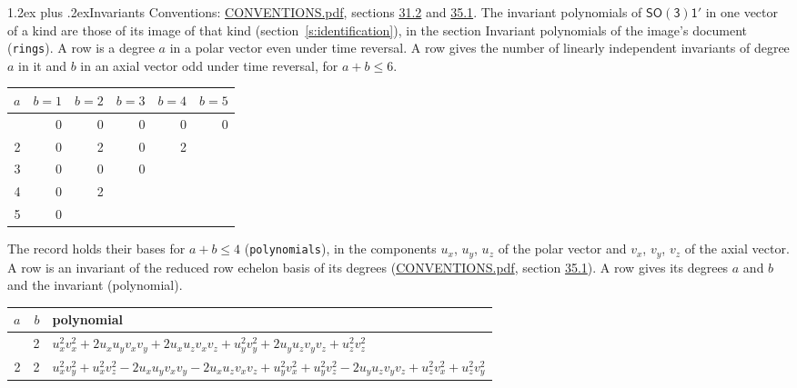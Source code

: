 \documentclass[10pt,a4paper]{article}
\makeatletter
\renewcommand\section{\@startsection{section}{1}{\z@}{-3ex plus -1ex minus -.2ex}%
  {1.2ex plus .2ex}{\normalfont\large\sffamily\bfseries\color{parttitle}}}
\numberwithin{equation}{section}
\newcommand{\grp}[1]{\mathsf{#1}}
\makeatother
\begin{document}
\section{Invariants}\label{s:invariants}
Conventions: \href{../../CONVENTIONS.pdf}{CONVENTIONS.pdf}, sections \href{../../CONVENTIONS.pdf\#conv.31.2}{31.2} and \href{../../CONVENTIONS.pdf\#conv.35.1}{35.1}.
The invariant polynomials of $\grp{SO(3)1'}$ in one vector of a kind are those of its image of that kind (section~\ref{s:identification}), in the section Invariant polynomials of the image's document (\texttt{rings}).
\leavevmode\label{n:index.degree.polar}\label{n:index.degree.axial}A row is a degree $a$ in a polar vector even under time reversal. A row gives the number of linearly independent invariants of degree $a$ in it and $b$ in an axial vector odd under time reversal, for $a + b \le 6$.
{\small\begin{longtable}{@{}rrrrrr@{}}\toprule
$a$ & $b = 1$ & $b = 2$ & $b = 3$ & $b = 4$ & $b = 5$\\\midrule\endhead
\bottomrule\endfoot\endlastfoot
1 & 0 & 0 & 0 & 0 & 0\\*
2 & 0 & 2 & 0 & 2 & \\*
3 & 0 & 0 & 0 &  & \\*
4 & 0 & 2 &  &  & \\*
5 & 0 &  &  &  & \\
\bottomrule\end{longtable}}
\leavevmode\label{n:local.component.polar}\label{n:local.component.axial}The record holds their bases for $a + b \le 4$ (\texttt{polynomials}), in the components $u_{x}$, $u_{y}$, $u_{z}$ of the polar vector and $v_{x}$, $v_{y}$, $v_{z}$ of the axial vector. \label{n:head.polynomial}A row is an invariant of the reduced row echelon basis of its degrees (\href{../../CONVENTIONS.pdf}{CONVENTIONS.pdf}, section \href{../../CONVENTIONS.pdf\#conv.35.1}{35.1}). A row gives its degrees $a$ and $b$ and the invariant (polynomial).
{\small\renewcommand{\arraystretch}{1.2}\begin{longtable}{@{}rrl@{}}\toprule
$a$ & $b$ & polynomial\\\midrule\endhead
\bottomrule\endfoot\endlastfoot
2 & 2 & $u_{x}^{2}v_{x}^{2} + 2u_{x}u_{y}v_{x}v_{y} + 2u_{x}u_{z}v_{x}v_{z} + u_{y}^{2}v_{y}^{2} + 2u_{y}u_{z}v_{y}v_{z} + u_{z}^{2}v_{z}^{2}$\\*
2 & 2 & $u_{x}^{2}v_{y}^{2} + u_{x}^{2}v_{z}^{2} - 2u_{x}u_{y}v_{x}v_{y} - 2u_{x}u_{z}v_{x}v_{z} + u_{y}^{2}v_{x}^{2} + u_{y}^{2}v_{z}^{2} - 2u_{y}u_{z}v_{y}v_{z} + u_{z}^{2}v_{x}^{2} + u_{z}^{2}v_{y}^{2}$\\
\bottomrule\end{longtable}}
\end{document}

